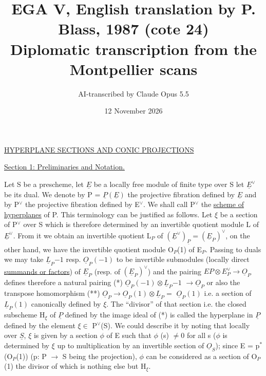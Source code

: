 \documentclass[11pt]{article}
\title{EGA V, English translation by P. Blass, 1987 (cote 24)\\[4pt]\large Diplomatic transcription from the Montpellier scans}
\author{AI-transcribed by Claude Opus 5.5}
\date{12 November 2026}
\newcommand{\scanpage}[1]{\par\bigskip\noindent{\small\sffamily[scan #1]}\par}
\newcommand{\mspage}[1]{{\small\sffamily[p.\,#1]}}
\newcommand{\uline}[1]{\underline{#1}}
\begin{document}
\maketitle

\scanpage{24/4}
\mspage{4}

\uline{HYPERPLANE SECTIONS AND CONIC PROJECTIONS}

\uline{Section 1: Preliminaries and Notation.}

Let S be a prescheme, let $\underline{E}$ be a locally free module of
finite type over S let $\underline{E}^{\vee}$ be its dual. We denote by P = $\underline{P}(\underline{E})$ the
projective fibration defined by $\underline{E}$ and by P$^{\vee}$ the projective
fibration defined by E$^{\vee}$. We shall call P$^{\vee}$ the \uline{scheme of}
\uline{hyperplanes} of P. This terminology can be justified as follows.
Let $\xi$ be a section of P$^{\vee}$ over S which is therefore determined by an
invertible quotient module L of $\underline{E}^{\vee}$. From it we obtain an
invertible quotient L$_{P}$ of $(\underline{E}^{\vee})_{\underline{P}} = (\underline{E}_{P})^{\vee}$, on the other hand, we have
the invertible quotient module O$_{P}$(1) of E$_{P}$. Passing to duals we
may take $\underline{L}_{P}{-1}$ resp. $\underline{O}_{P}(-1)$ to be invertible submodules (locally
direct \uline{summands or factors}) of $\underline{E}_{P}$ (resp. of $(\underline{E}_{P})^{\vee}$) and the pairing
$EP \otimes E^{\vee}_{P} \to \underline{O}_{P}$ defines therefore a natural pairing (*) $\underline{O}_{P}(-1) \otimes \underline{L}_{P}{-1}$
$\to \underline{O}_{P}$ or also the transpose homomorphism (**) $\underline{O}_{P} \to \underline{O}_{P}(1) \otimes \underline{L}_{P} =$
$\underline{O}_{P}(1)$ i.e. a section of $\underline{L}_{P}(1)$ canonically defined by $\xi$. The
``divisor'' of that section i.e. the closed subscheme H$_{\xi}$ of $\underline{P}$ defined
by the image ideal of (*) is called the hyperplane in $\underline{P}$ defined by
the element $\xi \in$ P$^{\vee}$(S). We could describe it by noting that locally
over $\underline{S}$, $\xi$ is given by a section $\phi$ of E such that $\phi$ (s) $\neq 0$ for all
s ($\phi$ is determined by $\xi$ up to multiplication by an invertible
section of $\underline{O}_{S}$); since E = p$^{*}$(O$_{P}$(1)) (p: P $\to$ S being the
projection), $\phi$ can be considered as a section of O$_{P}$(1) the divisor
of which is nothing else but H$_{\xi}$.
\end{document}
